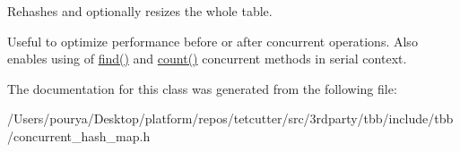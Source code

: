 Rehashes and optionally resizes the whole table. 

Useful to optimize performance before or after concurrent operations. Also enables using of \hyperlink{classtbb_1_1interface5_1_1concurrent__hash__map_a6d95753173af3646ba9281fd119f5733}{find()} and \hyperlink{classtbb_1_1interface5_1_1concurrent__hash__map_a7f9cb611a5effb650959cdde1b8ee901}{count()} concurrent methods in serial context. 

The documentation for this class was generated from the following file\+:\begin{DoxyCompactItemize}
\item 
/\+Users/pourya/\+Desktop/platform/repos/tetcutter/src/3rdparty/tbb/include/tbb/concurrent\+\_\+hash\+\_\+map.\+h\end{DoxyCompactItemize}
